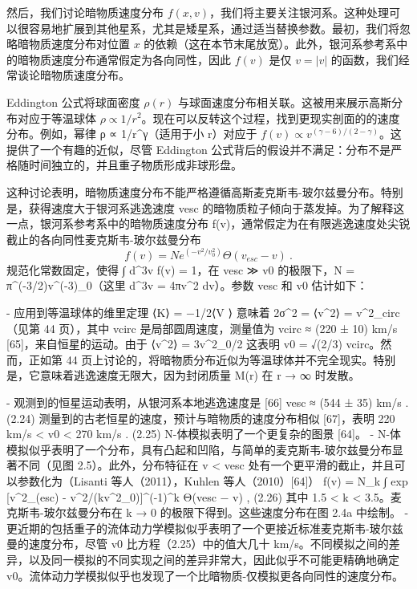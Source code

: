 

然后，我们讨论暗物质速度分布 $f(x, v)$，我们将主要关注银河系。这种处理可以很容易地扩展到其他星系，尤其是矮星系，通过适当替换参数。最初，我们将忽略暗物质速度分布对位置 $x$ 的依赖（这在本节末尾放宽）。此外，银河系参考系中的暗物质速度分布通常假定为各向同性，因此 $f(v)$ 是仅 $v = |v|$ 的函数，我们经常谈论暗物质速度分布。


Eddington 公式将球面密度 $\rho (r)$ 与球面速度分布相关联。这被用来展示高斯分布对应于等温球体 $\rho \propto 1/r^2$。现在可以反转这个过程，找到更现实剖面的的速度分布。例如，幂律 ρ ∝ 1/r^γ（适用于小 r）对应于 $f(v) \propto v^{(\gamma-6)/(2-\gamma)}$。这提供了一个有趣的近似，尽管 Eddington 公式背后的假设并不满足：分布不是严格随时间独立的，并且重子物质形成非球形盘。

这种讨论表明，暗物质速度分布不能严格遵循高斯麦克斯韦-玻尔兹曼分布。特别是，获得速度大于银河系逃逸速度 vesc 的暗物质粒子倾向于蒸发掉。为了解释这一点，银河系参考系中的暗物质速度分布 f(v)，通常假定为在有限逃逸速度处尖锐截止的各向同性麦克斯韦-玻尔兹曼分布
\begin{equation}
f(v) = N e^{(-v^2/v^2_0)} \Theta (v_{esc} - v)~.
\end{equation}
规范化常数固定，使得 ∫ d^3v f(v) = 1，在 vesc ≫ v0 的极限下，N = π^(-3/2)v^(-3)_0（这里 d^3v = 4πv^2 dv）。参数 vesc 和 v0 估计如下：

- 应用到等温球体的维里定理 ⟨K⟩ = −1/2⟨V ⟩ 意味着 2σ^2 = ⟨v^2⟩ = v^2_circ（见第 44 页），其中 vcirc 是局部圆周速度，测量值为 vcirc ≈ (220 ± 10) km/s [65]，来自恒星的运动。由于 ⟨v^2⟩ = 3v^2_0/2 这表明 v0 = √(2/3) vcirc。然而，正如第 44 页上讨论的，将暗物质分布近似为等温球体并不完全现实。特别是，它意味着逃逸速度无限大，因为封闭质量 M(r) 在 r → ∞ 时发散。

- 观测到的恒星运动表明，从银河系本地逃逸速度是 [66]
vesc ≈ (544 ± 35) km/s . (2.24)
测量到的古老恒星的速度，预计与暗物质的速度分布相似 [67]，表明
220 km/s < v0 < 270 km/s . (2.25)
N-体模拟表明了一个更复杂的图景 [64]。
- N-体模拟似乎表明了一个分布，具有凸起和凹陷，与简单的麦克斯韦-玻尔兹曼分布显著不同（见图 2.5）。此外，分布特征在 v < vesc 处有一个更平滑的截止，并且可以参数化为（Lisanti 等人（2011），Kuhlen 等人（2010）[64]）
f(v) = N_k
∫ exp [v^2_(esc) - v^2/(kv^2_0)]^(-1)^k Θ(vesc − v) , (2.26)
其中 1.5 < k < 3.5。麦克斯韦-玻尔兹曼分布在 k → 0 的极限下得到。这些速度分布在图 2.4a 中绘制。
- 更近期的包括重子的流体动力学模拟似乎表明了一个更接近标准麦克斯韦-玻尔兹曼的速度分布，尽管 v0 比方程（2.25）中的值大几十 km/s。不同模拟之间的差异，以及同一模拟的不同实现之间的差异非常大，因此似乎不可能更精确地确定 v0。流体动力学模拟似乎也发现了一个比暗物质-仅模拟更各向同性的速度分布。

